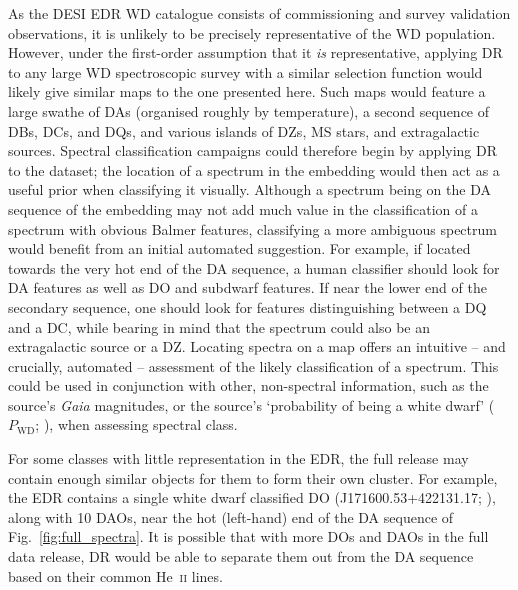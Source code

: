\documentclass[fleqn,usenatbib]{mnras}
\begin{document}
As the DESI EDR WD catalogue consists of commissioning and survey validation observations, it is unlikely to be precisely representative of the WD population.
However, under the first-order assumption that it \textit{is} representative, applying DR to any large WD spectroscopic survey with a similar selection function would likely give similar maps to the one presented here.
Such maps would feature a large swathe of DAs (organised roughly by temperature), a second sequence of DBs, DCs, and DQs, and various islands of DZs, MS stars, and extragalactic sources.
Spectral classification campaigns could therefore begin by applying DR to the dataset; the location of a spectrum in the embedding would then act as a useful prior when classifying it visually.
Although a spectrum being on the DA sequence of the embedding may not add much value in the classification of a spectrum with obvious Balmer features, classifying a more ambiguous spectrum would benefit from an initial automated suggestion.
For example, if located towards the very hot end of the DA sequence, a human classifier should look for DA features as well as DO and subdwarf features.
If near the lower end of the secondary sequence, one should look for features distinguishing between a DQ and a DC, while bearing in mind that the spectrum could also be an extragalactic source or a DZ.
Locating spectra on a map offers an intuitive -- and crucially, automated -- assessment of the likely classification of a spectrum.
This could be used in conjunction with other, non-spectral information, such as the source's \textit{Gaia} magnitudes, or the source's `probability of being a white dwarf' ($P_\text{WD}$; \citealt{gentilefusillo15}), when assessing spectral class.

For some classes with little representation in the EDR, the full release may contain enough similar objects for them to form their own cluster.
For example, the EDR contains a single white dwarf classified DO (J171600.53+422131.17; \citealt{manser24}), along with 10 DAOs, near the hot (left-hand) end of the DA sequence of Fig.~\ref{fig:full_spectra}.
It is possible that with more DOs and DAOs in the full data release, DR would be able to separate them out from the DA sequence based on their common He~\textsc{ii} lines.
\end{document}
